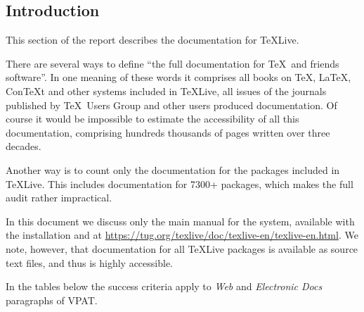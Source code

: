 \documentclass[titlepage]{article}
\newlength\vpatnumcollen
\begin{document}
\subsection{Introduction}
\label{sec:wcag-intro}

This section of the report describes the documentation for \TeX Live.

There are several ways to define ``the full documentation for \TeX\
and friends software''.  In one meaning of these words it comprises
all books on \TeX, \LaTeX, Con\TeX t and other systems included in
\TeX Live, all issues of the journals published by \TeX\ Users Group
and other users produced documentation.  Of course it would be
impossible to estimate the accessibility of all this documentation,
comprising hundreds thousands of pages written over three decades.

Another way is to count only the documentation for the packages
included in \TeX Live.  This includes documentation for 7300+
packages, which makes the full audit rather impractical.

In this document we discuss only the main manual for the system,
available with the installation and at
\url{https://tug.org/texlive/doc/texlive-en/texlive-en.html}.  We
note, however, that documentation for all \TeX Live packages is
available as source text files, and thus is highly accessible.  


In the tables below the success criteria apply to \emph{Web} and
\emph{Electronic Docs} paragraphs of VPAT.

\clearpage 
\settowidth{} 
\end{document}
